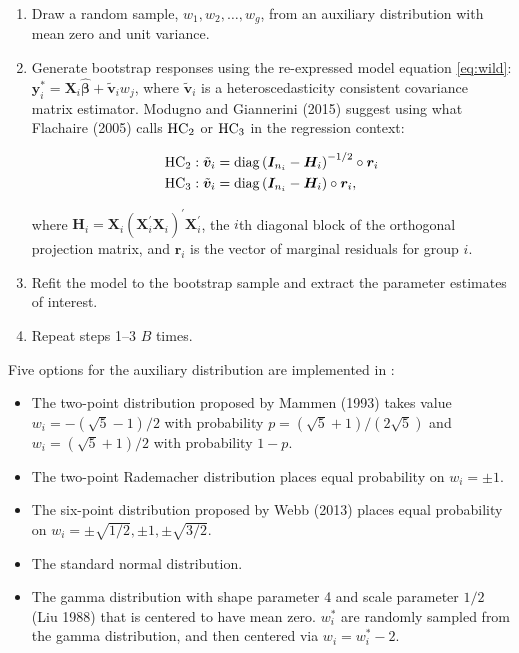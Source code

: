 \begin{enumerate}
\def\labelenumi{\arabic{enumi}.}
\item
  Draw a random sample, \(w_1, w_2, \ldots, w_g\), from an auxiliary distribution with mean zero and unit variance.
\item
  Generate bootstrap responses using the re-expressed model equation \eqref{eq:wild}: \(\boldsymbol{y}^*_i = \boldsymbol{X}_i \widehat{\boldsymbol{\beta}} + \tilde{\boldsymbol{v}}_i w_j\), where \(\tilde{\boldsymbol{v}}_i\) is a heteroscedasticity consistent covariance matrix estimator. Modugno and Giannerini (2015) suggest using what Flachaire (2005) calls \({{\rm HC}_2}\) or \({{\rm HC}_3}\) in the regression context:

  \begin{align}
  {{\rm HC}_2}&: \tilde{\boldsymbol{v}}_i = {\rm diag} \left( \boldsymbol{I}_{n_i} - \boldsymbol{H}_i \right)^{-1/2} \circ \boldsymbol{r}_i\\
  {{\rm HC}_3}&: \tilde{\boldsymbol{v}}_i = {\rm diag} \left( \boldsymbol{I}_{n_i} - \boldsymbol{H}_i \right) \circ \boldsymbol{r}_i,
  \end{align}

  where \(\boldsymbol{H}_i = \boldsymbol{X}_i \left(\boldsymbol{X}_i^\prime \boldsymbol{X}_i \right)^\prime \boldsymbol{X}_i^\prime\), the \(i\)th diagonal block of the orthogonal projection matrix, and \(\boldsymbol{r}_i\) is the vector of marginal residuals for group \(i\).
\item
  Refit the model to the bootstrap sample and extract the parameter estimates of interest.
\item
  Repeat steps 1--3 \(B\) times.
\end{enumerate}

Five options for the auxiliary distribution are implemented in :

\begin{itemize}
\item
  The two-point distribution proposed by Mammen (1993) takes value \(w_i=-(\sqrt{5} - 1)/2\) with probability \(p=(\sqrt{5}+1) / (2 \sqrt{5})\) and \(w_i = (\sqrt{5} + 1)/2\) with probability \(1-p\).
\item
  The two-point Rademacher distribution places equal probability on \(w_i = \pm 1\).
\item
  The six-point distribution proposed by Webb (2013) places equal probability on \(w_i = \pm \sqrt{1/2}, \pm1, \pm \sqrt{3/2}\).
\item
  The standard normal distribution.
\item
  The gamma distribution with shape parameter 4 and scale parameter \(1/2\) (Liu 1988) that is centered to have mean zero. \(w_i^*\) are randomly sampled from the gamma distribution, and then centered via \(w_i = w_i^* - 2\).
\end{itemize}

